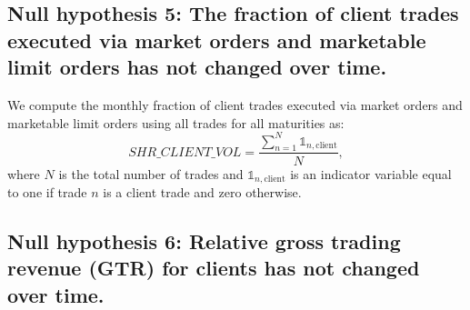 \documentclass[hidelinks, 11pt]{article}
\begin{document}




\subsection{Null hypothesis 5: The fraction of client trades executed via market orders and marketable limit orders has not changed over time.}


We compute the monthly fraction of client trades executed via market orders and marketable limit orders using all trades for all maturities as:
\begin{equation}
SHR\_CLIENT\_VOL  = \frac{\sum_{n=1}^N \mathds{1}_{n,\text{client}}}{N},
\end{equation}
where $N$ is the total number of trades and $\mathds{1}_{n,\text{client}}$ is an indicator variable equal to one if trade $n$ is a client trade and zero otherwise.






\subsection{Null hypothesis 6: Relative gross trading revenue (GTR) for clients has not changed over time.}

\end{document}
